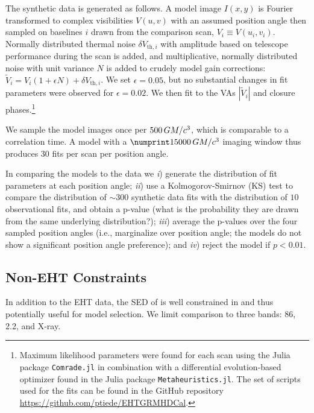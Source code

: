 The synthetic data is generated as follows.
A model image $I(x,y)$ is Fourier transformed to complex visibilities $V(u,v)$ with an assumed position angle then sampled on baselines $i$ drawn from the comparison scan, $V_i \equiv V(u_i,v_i)$.
Normally distributed thermal noise $\delta V_{\mathrm{th},i}$ with amplitude based on telescope performance during the scan is added, and multiplicative, normally distributed noise with unit variance $N$ is added to crudely model gain corrections: $\tilde{V}_i = V_i (1 + \epsilon N) + \delta V_{\mathrm{th},i}$.
We set $\epsilon = 0.05$, but no substantial changes in fit parameters were observed for $\epsilon = 0.02$.
We then fit to the VAs $|\tilde{V}_i|$ and closure phases.\footnote{Maximum likelihood \mring parameters were found for each scan using the Julia package \texttt{Comrade.jl} \citep{comrade} in combination with a differential evolution-based optimizer
found in the Julia package \texttt{Metaheuristics.jl}.  The set of scripts used for the fits can be found in the GitHub repository \url{https://github.com/ptiede/EHTGRMHDCal}.}

We sample the model images once per $500\,GM/c^3$, which is comparable to a correlation time.
A model with a $\no{15000}\,\tg$ imaging window thus produces $30$ fits per scan per position angle.

In comparing the models to the data we
\emph{i}) generate the distribution of fit parameters at each position angle;
\emph{ii}) use a Kolmogorov-Smirnov (KS) test to compare the distribution of $\sim 300$ synthetic data fits with the distribution of $10$ observational fits, and obtain a p-value (what is the probability they are drawn from the same underlying distribution?);
\emph{iii}) average the p-values over the four sampled position angles (i.e., marginalize over position angle; the models do not show a significant position angle preference); and
\emph{iv}) reject the model if $p < 0.01$.

\subsection{Non-EHT Constraints}

In addition to the EHT data, the SED of \sgra is well constrained in  and thus potentially useful for model selection.
We limit comparison to three bands: 86\GHz, 2.2\um, and X-ray.

